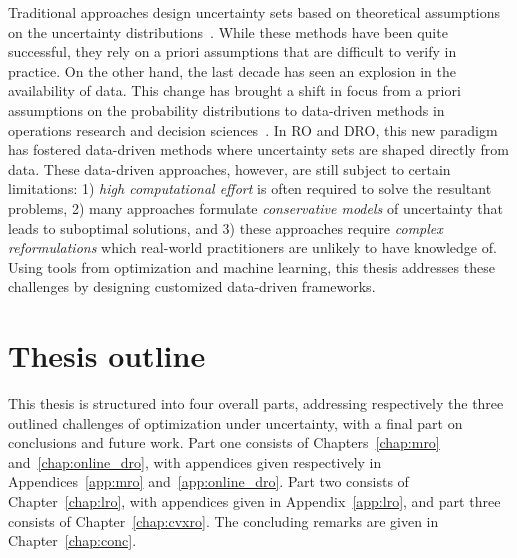 Traditional approaches design uncertainty sets based on theoretical assumptions on the uncertainty distributions~\citep{ben-tal_robust_2000,bandi_tractable_2012,ben-tal_robust_2009,bertsimas_price_2004}.
While these methods have been quite successful, they rely on a priori assumptions that are difficult to verify in practice.
On the other hand, the last decade has seen an explosion in the availability of data.
This change has brought a shift in focus from a priori assumptions on the probability distributions to data-driven methods in operations research and decision sciences~\citep{bertsimas_data-driven_2018}.
In \gls{RO} and \gls{DRO}, this new paradigm has fostered data-driven methods where uncertainty sets are shaped directly from data. These data-driven approaches, however, are still subject to certain limitations: 1) {\it high computational effort} is often required to solve the resultant problems, 2) many approaches formulate {\it conservative models} of uncertainty that leads to suboptimal solutions, and 3) these approaches require {\it complex reformulations} which real-world practitioners are unlikely to have knowledge of.
Using tools from optimization and machine learning, this thesis addresses these challenges by designing customized data-driven frameworks.




\section{Thesis outline}
\label{sec:contributions}
This thesis is structured into four overall parts, addressing respectively the three outlined challenges of optimization under uncertainty, with a final part on conclusions and future work. 
Part one consists of Chapters~\ref{chap:mro} and~\ref{chap:online_dro}, with appendices given respectively in Appendices~\ref{app:mro} and~\ref{app:online_dro}. Part two consists of Chapter~\ref{chap:lro}, with appendices given in Appendix~\ref{app:lro}, and part three consists of Chapter~\ref{chap:cvxro}. The concluding remarks are given in Chapter~\ref{chap:conc}.

